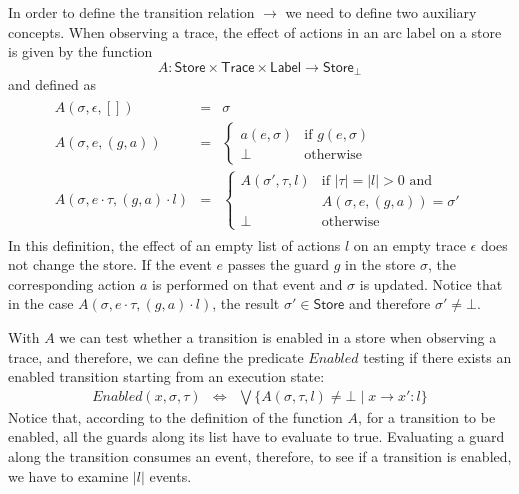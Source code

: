 \documentclass[10pt, preprint]{sigplanconf} %
\newcommand{\noterg}[2]{\textcolor{gray}{[\textcolor{red}{#1}: #2]}}
\newcommand{\rlp}[1]{\noterg{rlp}{#1}}
\newcommand{\set}[1]{\ensuremath{\mathsf{#1}}}
\begin{document}
In order to define the transition relation $\to$ we need to define two auxiliary concepts.
When observing a trace, the effect of actions in an arc label on a store  is given by the function
\[
   A : \set{Store} \times \set{Trace} \times \set{Label} \to \set{Store}_\bot
\] and defined as
\[
\begin{array}{l}
\begin{array}{lcl}
A(\sigma,\epsilon,[]) & = & \!\! \sigma
\\[2ex]
A(\sigma,e,(g,a)) & = & \!\! \left\{\begin{array}{ll}
     a(e,\sigma) & \mbox{if $g(e,\sigma)$}
     \\[1ex]
     \bot & \mbox{otherwise}
     \end{array}
     \right.
\\[5ex]
A(\sigma,e\cdot \tau,(g,a)\cdot l) & = & \!\! \left\{\begin{array}{ll}
     A(\sigma',\tau,l) & \mbox{if $|\tau|{=}|l|{>}0$ and }
     \\
& \mbox{$A(\sigma,e,(g,a)){=}\sigma'$}
     \\[1ex]
     \bot & \mbox{otherwise}
     \end{array}
     \right.
\end{array}
\end{array}\]
In this definition, the effect of an empty list of actions $l$ on an empty trace $\epsilon$ does not change the store.
If the event $e$ passes the guard $g$ in the store $\sigma$, the corresponding action $a$ is performed on that event 
and  $\sigma$ is updated. Notice that in  the case $A(\sigma,e\cdot \tau,(g,a)\cdot l)$, the result $\sigma' \in \set{Store}$ and therefore $\sigma' \neq \bot$. 

With $A$ we can test whether a
transition is enabled in a store when observing a trace, and therefore, we can define the
predicate $Enabled$ testing if there exists an enabled transition
starting from an execution state:
\begin{eqnarray*}
Enabled(x,\sigma,\tau) & \Leftrightarrow  & \bigvee \{ A(\sigma,\tau,l) \neq \bot \mid x \to x' : l \}
\end{eqnarray*}
Notice that, according to the definition of the function $A$, for a transition to be enabled, all the guards along its list have to evaluate to true.
Evaluating a guard along the transition consumes an event, therefore, to see if a transition is enabled, we have to examine $|l|$ events.
\end{document}
